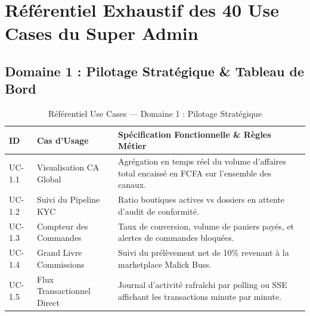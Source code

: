 \documentclass[11pt,a4paper,titlepage]{report}
\begin{document}
\chapter{Référentiel Exhaustif des 40 Use Cases du Super Admin}

\section{Domaine 1 : Pilotage Stratégique \& Tableau de Bord}
\begin{table}[h!]
\centering
\small
\begin{tabularx}{\textwidth}{@{}llX@{}}
\toprule
\rowcolor{tableheader}
\textbf{ID} & \textbf{Cas d'Usage} & \textbf{Spécification Fonctionnelle \& Règles Métier} \\
\midrule
UC-1.1 & Visualisation CA Global & Agrégation en temps réel du volume d'affaires total encaissé en FCFA sur l'ensemble des canaux. \\
UC-1.2 & Suivi du Pipeline KYC & Ratio boutiques actives vs dossiers en attente d'audit de conformité. \\
UC-1.3 & Compteur des Commandes & Taux de conversion, volume de paniers payés, et alertes de commandes bloquées. \\
UC-1.4 & Grand Livre Commissions & Suivi du prélèvement net de 10\% revenant à la marketplace Malick Buss. \\
UC-1.5 & Flux Transactionnel Direct & Journal d'activité rafraîchi par polling ou SSE affichant les transactions minute par minute. \\
\bottomrule
\end{tabularx}
\caption{Référentiel Use Cases — Domaine 1 : Pilotage Stratégique}
\end{table}
\end{document}
